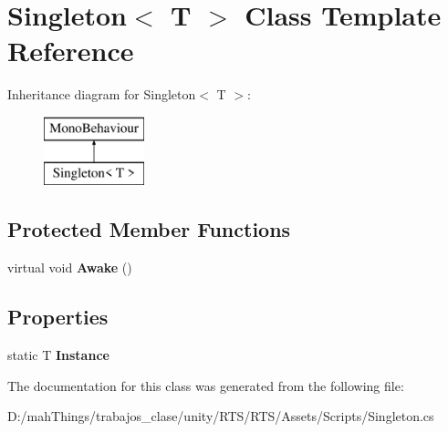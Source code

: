 \hypertarget{class_singleton}{}\section{Singleton$<$ T $>$ Class Template Reference}
\label{class_singleton}
Inheritance diagram for Singleton$<$ T $>$\+:\begin{figure}[H]
\begin{center}
\leavevmode
\includegraphics[height=2.000000cm]{class_singleton}
\end{center}
\end{figure}
\subsection*{Protected Member Functions}
\begin{DoxyCompactItemize}
\item 
\mbox{\label{class_singleton_a72d236a3a431af6b9cbce52964361b6b}} 
virtual void {\bfseries Awake} ()
\end{DoxyCompactItemize}
\subsection*{Properties}
\begin{DoxyCompactItemize}
\item 
\mbox{\label{class_singleton_a54103e8475b2a352ee759d5732307534}} 
static T {\bfseries Instance}
\end{DoxyCompactItemize}


The documentation for this class was generated from the following file\+:\begin{DoxyCompactItemize}
\item 
D\+:/mah\+Things/trabajos\+\_\+clase/unity/\+R\+T\+S/\+R\+T\+S/\+Assets/\+Scripts/Singleton.\+cs\end{DoxyCompactItemize}
